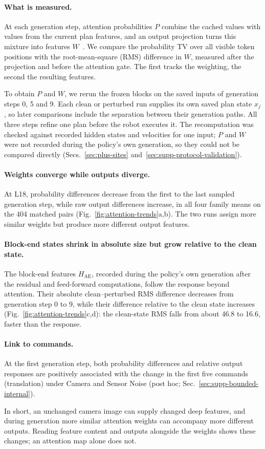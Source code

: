 \paragraph{What is measured.}
At each generation step, attention probabilities $P$ combine the cached values with values from the current plan features, and an output projection turns this mixture into features $W$~\cite{kobayashi2020}. We compare the probability TV over all visible token positions with the root-mean-square (RMS) difference in $W$, measured after the projection and before the attention gate. The first tracks the weighting, the second the resulting features.

To obtain $P$ and $W$, we rerun the frozen blocks on the saved inputs of generation steps 0, 5 and 9. Each clean or perturbed run supplies its own saved plan state $x_j$, so later comparisons include the separation between their generation paths. All three steps refine one plan before the robot executes it. The recomputation was checked against recorded hidden states and velocities for one input; $P$ and $W$ were not recorded during the policy's own generation, so they could not be compared directly (Secs.~\ref{sec:plus-sites} and~\ref{sec:supp-protocol-validation}).

\paragraph{Weights converge while outputs diverge.}
At L18, probability differences decrease from the first to the last sampled generation step, while raw output differences increase, in all four family means on the 404 matched pairs (Fig.~\ref{fig:attention-trends}a,b). The two runs assign more similar weights but produce more different output features.

\paragraph{Block-end states shrink in absolute size but grow relative to the clean state.}
The block-end features $H_{\mathrm{AE}}$, recorded during the policy's own generation after the residual and feed-forward computations, follow the response beyond attention. Their absolute clean--perturbed RMS difference decreases from generation step 0 to 9, while their difference relative to the clean state increases (Fig.~\ref{fig:attention-trends}c,d): the clean-state RMS falls from about 46.8 to 16.6, faster than the response.

\paragraph{Link to commands.}
At the first generation step, both probability differences and relative output responses are positively associated with the change in the first five commands (translation) under Camera and Sensor Noise (post hoc; Sec.~\ref{sec:supp-bounded-internal}).

In short, an unchanged camera image can supply changed deep features, and during generation more similar attention weights can accompany more different outputs. Reading feature content and outputs alongside the weights shows these changes; an attention map alone does not.
